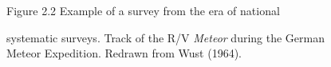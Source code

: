 \begin{figure}[t!]
\centering
\footnotesize
Figure 2.2 Example of a survey from the era of national\rule{0pt}{3ex}
systematic surveys. Track of the R/V \textit{Meteor} during the German
Meteor Expedition. Redrawn from Wust (1964).

\label{fig:Fig2-2}
\vspace{-3ex}
\end{figure}
